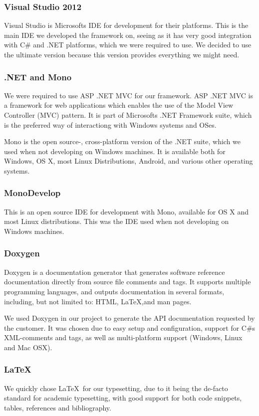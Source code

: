 \subsubsection{Visual Studio 2012}
Visual Studio is Microsofts IDE for development for their platforms. This is the main IDE we developed the framework on, seeing as it has very good integration with C\# and .NET platforms, which we were required to use. We decided to use the ultimate version because this version provides everything we might need.

\subsubsection{.NET and Mono}
We were required to use ASP .NET MVC for our framework. ASP .NET MVC is a framework for web applications which enables the use of the Model View Controller (MVC) pattern. It is part of Microsofts .NET Framework suite, which is the preferred way of interactiong with Windows systems and OSes.

Mono is the open source-, cross-platform version of the .NET suite, which we used when not developing on Windows machines. It is available both for Windows, OS X, most Linux Distributions, Android, and various other operating systems.

\subsubsection{MonoDevelop}
This is an open source IDE for development with Mono, available for OS X and most Linux distributions. This was the IDE used when not developing on Windows machines.

\subsubsection{Doxygen}
Doxygen is a documentation generator that generates software reference documentation directly from source file comments and tags. It supports multiple programming languages, and outputs documentation in several formats, including, but not limited to: HTML, {LaTeX},and man pages.

We used Doxygen in our project to generate the API documentation requested by the customer. It was chosen due to easy setup and configuration, support for C\#s XML-comments and tags, as well as multi-platform support (Windows, Linux and Mac OSX).

\subsubsection{\LaTeX}
We quickly chose \LaTeX \ for our typesetting, due to it being the de-facto standard for academic typesetting, with good support for both code snippets, tables, references and bibliography.

